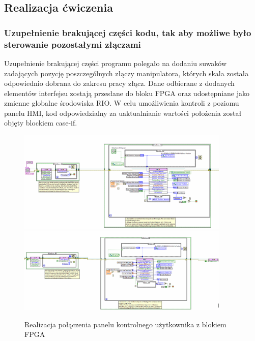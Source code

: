 \documentclass[margin = 2cm]{article}
\begin{document}
	\subsection{Realizacja ćwiczenia}
  		\subsubsection{Uzupełnienie brakującej części kodu, tak aby możliwe było sterowanie pozostałymi złączami}
Uzupełnienie brakującej części programu polegało na dodaniu suwaków zadających pozycję poszczególnych złączy manipulatora, których skala została odpowiednio dobrana do zakresu pracy złącz. Dane odbierane z dodanych elementów interfejsu zostają przesłane do bloku FPGA oraz udostępniane jako zmienne globalne środowiska RIO. W celu umożliwienia kontroli z poziomu panelu HMI, kod odpowiedzialny za uaktualnianie wartości położenia został objęty blockiem case-if.
	\begin{figure}[H]
		\centering
		\includegraphics[width=0.9\textwidth]{3_1}
		\includegraphics[width=0.9\textwidth]{3_2}
		\caption{Realizacja połączenia panelu kontrolnego użytkownika z blokiem FPGA}
	\end{figure}
\end{document}
